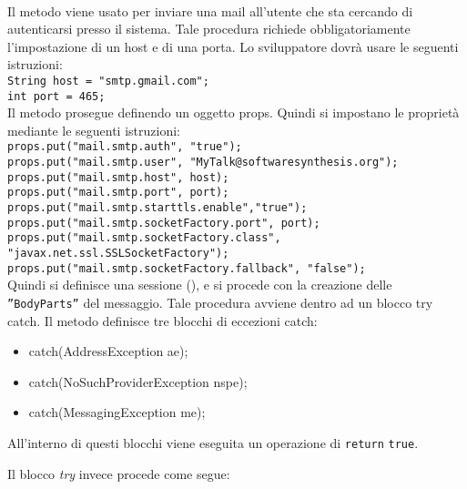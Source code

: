 \begin{description}
\item{}\\

Il metodo viene usato per inviare una mail all'utente che sta cercando di autenticarsi presso il sistema. Tale procedura richiede obbligatoriamente l'impostazione di un host e di una porta. Lo sviluppatore dovrà usare le seguenti istruzioni:\\

\verb|String host = "smtp.gmail.com";|\\
\verb|int port = 465;|\\

Il metodo prosegue definendo un oggetto  props.  Quindi si impostano le proprietà mediante le seguenti  istruzioni:\\

\verb|props.put("mail.smtp.auth", "true");|\\
\verb|props.put("mail.smtp.user", "MyTalk@softwaresynthesis.org");|\\
\verb|props.put("mail.smtp.host", host);|\\
\verb|props.put("mail.smtp.port", port);|\\
\verb|props.put("mail.smtp.starttls.enable","true");|\\
\verb|props.put("mail.smtp.socketFactory.port", port);|\\
\verb|props.put("mail.smtp.socketFactory.class", "javax.net.ssl.SSLSocketFactory");|\\
\verb|props.put("mail.smtp.socketFactory.fallback", "false");|\\

Quindi si definisce una sessione (), e si procede con la creazione delle \texttt{''BodyParts''} del messaggio. Tale procedura avviene dentro ad un blocco try catch. Il metodo definisce tre blocchi di eccezioni catch:
\begin{itemize}
	\item catch(AddressException ae);
	\item catch(NoSuchProviderException nspe);
	\item catch(MessagingException me);
\end{itemize}

All'interno di questi blocchi viene eseguita un operazione di \texttt{return} \texttt{true}.

Il blocco \textit{try} invece procede come segue:


\end{description}
